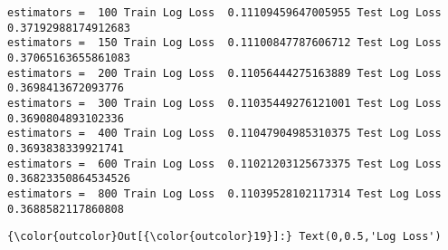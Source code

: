 \documentclass[11pt]{article}
\begin{document}
    \begin{Verbatim}[commandchars=\\\{\}]
estimators =  100 Train Log Loss  0.11109459647005955 Test Log Loss  0.37192988174912683
estimators =  150 Train Log Loss  0.11100847787606712 Test Log Loss  0.37065163655861083
estimators =  200 Train Log Loss  0.11056444275163889 Test Log Loss  0.3698413672093776
estimators =  300 Train Log Loss  0.11035449276121001 Test Log Loss  0.3690804893102336
estimators =  400 Train Log Loss  0.11047904985310375 Test Log Loss  0.3693838339921741
estimators =  600 Train Log Loss  0.11021203125673375 Test Log Loss  0.36823350864534526
estimators =  800 Train Log Loss  0.11039528102117314 Test Log Loss  0.3688582117860808

    \end{Verbatim}

\begin{Verbatim}[commandchars=\\\{\}]
{\color{outcolor}Out[{\color{outcolor}19}]:} Text(0,0.5,'Log Loss')
\end{Verbatim}
            
    \begin{center}
    \end{center}
    { \hspace*{\fill} \\}
    
\end{document}
